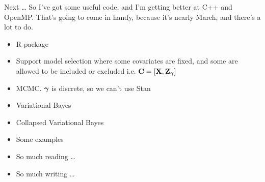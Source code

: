 \documentclass{beamer}
\begin{document}
\begin{frame}{Next \ldots}
So I've got some useful code, and I'm getting better at C++ and OpenMP. That's going to come in handy, 
because it's nearly March, and there's a lot to do.
\begin{itemize}
\item R package
\item Support model selection where some covariates are fixed, and some are allowed to be included or excluded
i.e. ${\bf C} = [{\bf X}, {\bf Z}_{\boldsymbol \gamma}]$
\item MCMC. ${\boldsymbol \gamma}$ is discrete, so we can't use Stan
\item Variational Bayes
\item Collapsed Variational Bayes
\item Some examples
\item So much reading \ldots
\item So much writing \ldots
\end{itemize}
\end{frame}
\end{document}
